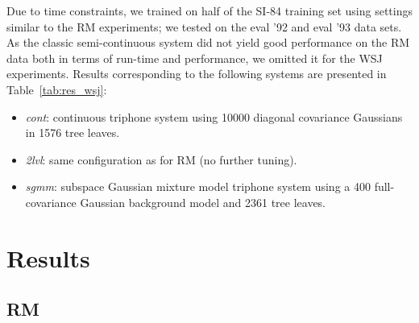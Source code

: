 \documentclass{article}
\begin{document}
Due to time constraints, we trained on 
half of the SI-84 training set using settings similar to the RM experiments; 
we tested on the eval '92 and eval '93 data sets.
As the classic semi-continuous system did not yield good performance on the
RM data both in terms of run-time and performance, we omitted it for the WSJ
experiments. Results corresponding to the following systems are presented in 
Table~\ref{tab:res_wsj}:
%
\begin{itemize}
\item
  {\em cont}: continuous triphone system using 10000 diagonal covariance
  Gaussians in 1576 tree leaves.
\item
    {\em 2lvl}: same configuration as for RM (no further tuning).
\item
  {\em sgmm}: subspace Gaussian mixture model triphone system using a 400 
  full-covariance Gaussian background model and 2361 tree leaves.
\end{itemize}


\section{Results}
\label{sec:results}

\subsection{RM}
\end{document}
